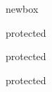 


\csname newbox\endcsname\PGFTESTBOX%

\csname protected\endcsname\long\def\SHOWBOX#1{%
  \begingroup
    \long\def\use##1{##1}%
    \showboxbreadth=\maxdimen
    \showboxdepth=\maxdimen
    \tracingonline=0 %
    \errorcontextlines=-1 %
    \showbox\use{#1}%
  \endgroup
}

\csname protected\endcsname\long\def\BEGINBOXTEST#1{%
  \BEGINTEST{#1}%
    \setbox\PGFTESTBOX=\hbox\bgroup
      \ignorespaces
}

\csname protected\endcsname\long\def\ENDBOXTEST{%
      \ifhmode\unskip\fi
    \egroup
    \SHOWBOX{\PGFTESTBOX}%
  \ENDTEST
}
